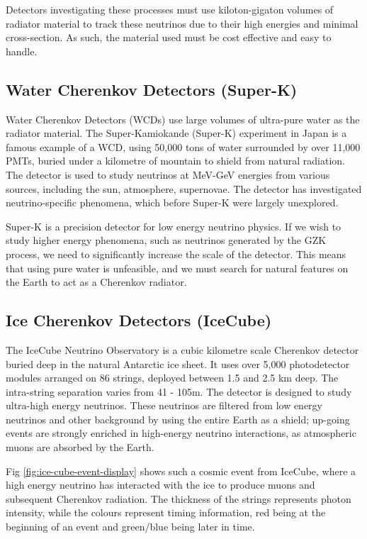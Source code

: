 Detectors investigating these processes must use kiloton-gigaton volumes of radiator material to track these neutrinos due to their high energies and minimal cross-section. As such, the material used must be cost effective and easy to handle.

\subsection{Water Cherenkov Detectors (Super-K)\label{sec:super-k}}
Water Cherenkov Detectors (WCDs) use large volumes of ultra-pure water as the radiator material. The Super-Kamiokande (Super-K)
experiment in Japan is a famous example of a WCD, using 50,000 tons of water surrounded by over 11,000 PMTs,
buried under a kilometre of mountain to shield from natural radiation. The detector is used to study neutrinos at MeV-GeV 
energies from various sources, including the sun, atmosphere, supernovae. The detector has investigated neutrino-specific phenomena, which before Super-K were largely unexplored.\nolinebreak\cite{super-k-neutrino-osc_1998}

Super-K is a precision detector for low energy neutrino physics. If we wish to study higher energy phenomena, such as neutrinos generated by the GZK process, we need to significantly increase the scale of the detector. This means that using pure water is unfeasible, and we must search for natural features on the Earth to act as a Cherenkov radiator.

\subsection{Ice Cherenkov Detectors (IceCube)}

The IceCube Neutrino Observatory is a cubic kilometre scale Cherenkov detector buried deep in the natural Antarctic ice sheet.\nolinebreak\cite{Aartsen_2017} 
It uses over 5,000 photodetector modules arranged on 86 strings, deployed between 1.5 and 2.5 km deep. The intra-string separation varies from 41 - 105m. The detector is designed to study ultra-high energy neutrinos. These neutrinos are filtered from low energy neutrinos and other background by using the entire Earth as a shield; up-going events are strongly enriched in high-energy neutrino interactions, as atmospheric muons are absorbed by the Earth. 

Fig \nolinebreak\ref{fig:ice-cube-event-display} shows such a cosmic event from IceCube, where a high energy neutrino has interacted with the ice to produce muons and subsequent Cherenkov radiation.
The thickness of the strings represents photon intensity, while the colours represent timing information, red being at the beginning of an event and green/blue being later in time.

